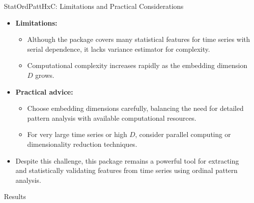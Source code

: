 \documentclass{beamer}
\begin{document}
\begin{frame}{StatOrdPattHxC: Limitations and Practical Considerations}
	\begin{itemize}
		\item \textbf{Limitations:}
		\begin{itemize}
			\item Although the package covers many statistical features for time series with serial dependence, it lacks variance estimator for complexity.
			\item Computational complexity increases rapidly as the embedding dimension $D$ grows.
		\end{itemize}
		\item \textbf{Practical advice:}
		\begin{itemize}
			\item Choose embedding dimensions carefully, balancing the need for detailed pattern analysis with available computational resources.
			\item For very large time series or high $D$, consider parallel computing or dimensionality reduction techniques.
		\end{itemize}
		\item Despite this challenge, this package remains a powerful tool for extracting and statistically validating features from time series using ordinal pattern analysis.
	\end{itemize}
\end{frame}

\begin{frame}
	\begin{center}
		\alert{Results}
	\end{center}
\end{frame}

\end{document}
